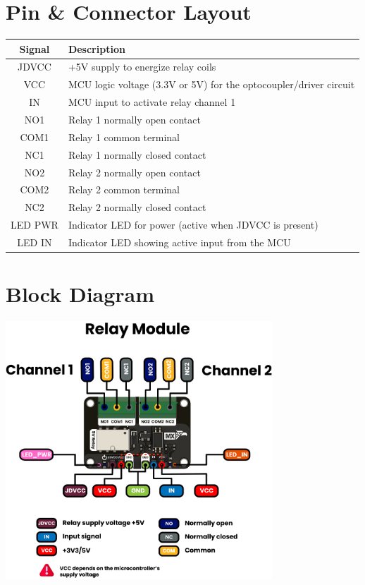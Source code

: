 \documentclass[10pt]{article}
\begin{document}
\section*{Pin \& Connector Layout}
\begin{tabularx}{\textwidth}{|c|>{\RaggedRight\arraybackslash}X|}
\hline
\rowcolor{headergray}
Signal & Description \\
\hline
JDVCC & +5V supply to energize relay coils \\
VCC & MCU logic voltage (3.3V or 5V) for the optocoupler/driver circuit \\
IN & MCU input to activate relay channel 1 \\
NO1 & Relay 1 normally open contact \\
COM1 & Relay 1 common terminal \\
NC1 & Relay 1 normally closed contact \\
NO2 & Relay 2 normally open contact \\
COM2 & Relay 2 common terminal \\
NC2 & Relay 2 normally closed contact \\
LED PWR & Indicator LED for power (active when JDVCC is present) \\
LED IN & Indicator LED showing active input from the MCU \\
\hline
\end{tabularx}


\FloatBarrier
\newpage
\vspace*{3em}
\section*{Block Diagram}
\vspace{1em}
\begin{center}
\includegraphics[width=0.75\textwidth,keepaspectratio]{../../hardware/resources/unit_pinout_v_0_0_1_ue0082_relay_en.png}
\end{center}
\newpage
\vspace*{3em}
\end{document}
